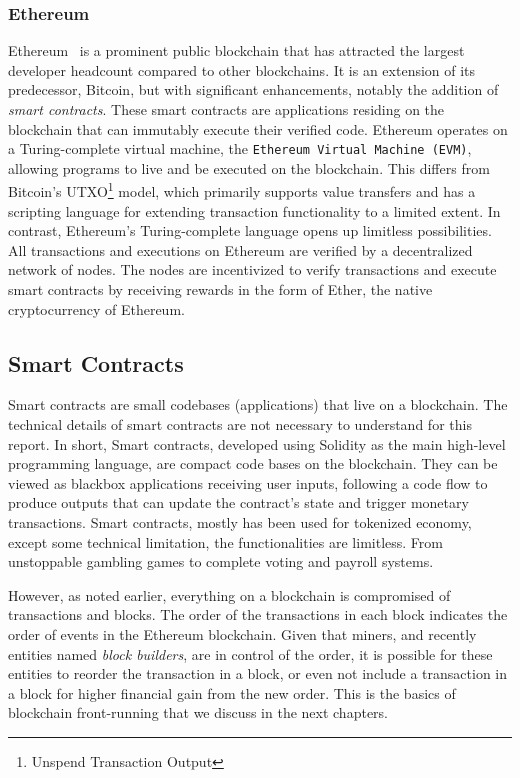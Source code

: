 \subsubsection{Ethereum}


Ethereum~\cite{wood2014ethereum} is a prominent public blockchain that has attracted the largest developer headcount compared to other blockchains. It is an extension of its predecessor, Bitcoin, but with significant enhancements, notably the addition of \textit{smart contracts}. These smart contracts are applications residing on the blockchain that can immutably execute their verified code. Ethereum operates on a Turing-complete virtual machine, the \texttt{Ethereum Virtual Machine (EVM)}, allowing programs to live and be executed on the blockchain. This differs from Bitcoin's UTXO\footnote{Unspend Transaction Output} model, which primarily supports value transfers and has a scripting language for extending transaction functionality to a limited extent. In contrast, Ethereum's Turing-complete language opens up limitless possibilities.  All transactions and executions on Ethereum are verified by a decentralized network of nodes. The nodes are incentivized to verify transactions and execute smart contracts by receiving rewards in the form of Ether, the native cryptocurrency of Ethereum.


\subsection{Smart Contracts}
Smart contracts are small codebases (applications) that live on a blockchain. The technical details of smart contracts are not necessary to understand for this report. In short, Smart contracts, developed using Solidity as the main high-level programming language, are compact code bases on the blockchain. They can be viewed as blackbox applications receiving user inputs, following a code flow to produce outputs that can update the contract's state and trigger monetary transactions. Smart contracts, mostly has been used for tokenized economy, except some technical limitation, the functionalities are limitless. From unstoppable gambling games to complete voting and payroll systems. 

However, as noted earlier, everything on a blockchain is compromised of transactions and blocks. The order of the transactions in each block indicates the order of events in the Ethereum blockchain. Given that miners, and recently entities named \textit{block builders}, are in control of the order, it is possible for these entities to reorder the transaction in a block, or even not include a transaction in a block for higher financial gain from the new order. This is the basics of blockchain front-running that we discuss in the next chapters. 


